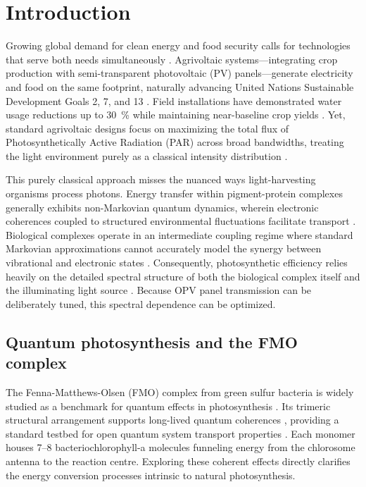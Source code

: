 
\section{Introduction}\label{sec:Introduction}

Growing global demand for clean energy and food security calls for technologies that serve both needs simultaneously \cite{Valle2017, Dupraz2011, Marrou2013, Asaa2024}. Agrivoltaic systems---integrating crop production with semi-transparent photovoltaic (PV) panels---generate electricity and food on the same footprint, naturally advancing United Nations Sustainable Development Goals 2, 7, and 13 \cite{Weselek2019, Amaducci2018, Campana2025, Kumdokrub2025}. Field installations have demonstrated water usage reductions up to \SI{30}{\percent} while maintaining near-baseline crop yields \cite{BaronGafford2019, Elamri2018, Souza2025}. Yet, standard agrivoltaic designs focus on maximizing the total flux of Photosynthetically Active Radiation (PAR) across broad bandwidths, treating the light environment purely as a classical intensity distribution \cite{MaLu2025, Adeh2019, Kujawa2025}.

This purely classical approach misses the nuanced ways light-harvesting organisms process photons. Energy transfer within pigment-protein complexes generally exhibits non-Markovian quantum dynamics, wherein electronic coherences coupled to structured environmental fluctuations facilitate transport \cite{Engel2007, Panitchayangkoon2010, Collini2010, Mohseni2008, Tao2020}. Biological complexes operate in an intermediate coupling regime where standard Markovian approximations cannot accurately model the synergy between vibrational and electronic states \cite{Ishizaki2009, Kelly2016, Blankenship2011, Scholes2011, Plenio2008, Sarovar2010, Huelga2013, Rebentrost2009}. Consequently, photosynthetic efficiency relies heavily on the detailed spectral structure of both the biological complex itself and the illuminating light source \cite{Curutchet2016, Gelzinis2017}. Because OPV panel transmission can be deliberately tuned, this spectral dependence can be optimized.

\subsection{Quantum photosynthesis and the FMO complex}

The Fenna-Matthews-Olsen (FMO) complex from green sulfur bacteria is widely studied as a benchmark for quantum effects in photosynthesis \cite{Fenna1974, Adolphs2006}. Its trimeric structural arrangement supports long-lived quantum coherences \cite{Engel2007, Collini2010}, providing a standard testbed for open quantum system transport properties \cite{Mohseni2014, Hildner2013}. Each monomer houses 7--8 bacteriochlorophyll-a molecules funneling energy from the chlorosome antenna to the reaction centre. Exploring these coherent effects directly clarifies the energy conversion processes intrinsic to natural photosynthesis.

